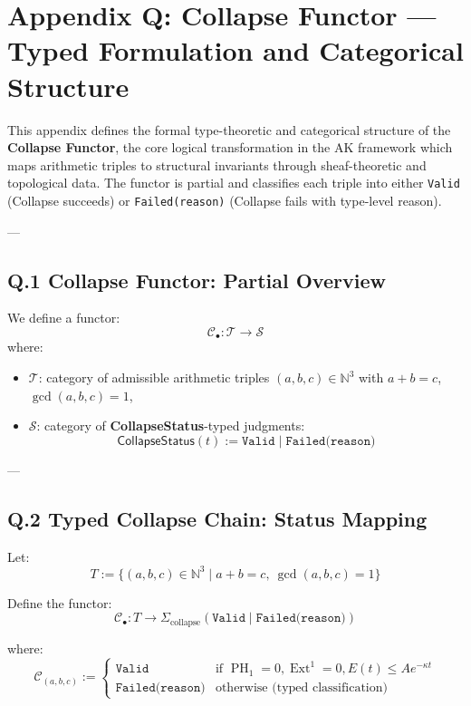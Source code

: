 \documentclass[11pt]{article}
\DeclareMathOperator{\Ext}{Ext}
\DeclareMathOperator{\PH}{PH}
\begin{document}
\section*{Appendix Q: Collapse Functor — Typed Formulation and Categorical Structure}

This appendix defines the formal type-theoretic and categorical structure of the \textbf{Collapse Functor},  
the core logical transformation in the AK framework which maps arithmetic triples to structural invariants  
through sheaf-theoretic and topological data. The functor is partial and classifies each triple into either  
\texttt{Valid} (Collapse succeeds) or \texttt{Failed(reason)} (Collapse fails with type-level reason).

---

\subsection*{Q.1 Collapse Functor: Partial Overview}

We define a functor:
\[
\mathcal{C}_\bullet : \mathcal{T} \longrightarrow \mathcal{S}
\]
where:
\begin{itemize}
  \item \( \mathcal{T} \): category of admissible arithmetic triples \( (a,b,c) \in \mathbb{N}^3 \) with \( a + b = c \), \( \gcd(a,b,c) = 1 \),
  \item \( \mathcal{S} \): category of \textbf{CollapseStatus}-typed judgments:
  \[
  \mathsf{CollapseStatus}(t) := \texttt{Valid} \;|\; \texttt{Failed(reason)}
  \]
\end{itemize}

---

\subsection*{Q.2 Typed Collapse Chain: Status Mapping}

Let:
\[
T := \{ (a,b,c) \in \mathbb{N}^3 \mid a + b = c,\ \gcd(a,b,c) = 1 \}
\]

Define the functor:
\[
\mathcal{C}_\bullet : T \to \Sigma_{\text{collapse}} \left( \texttt{Valid} \mid \texttt{Failed(reason)} \right)
\]

where:
\[
\mathcal{C}_{(a,b,c)} := 
\begin{cases}
  \texttt{Valid} & \text{if } \PH_1 = 0, \Ext^1 = 0, E(t) \leq Ae^{-\kappa t} \\
  \texttt{Failed(reason)} & \text{otherwise (typed classification)}
\end{cases}
\]
\end{document}

